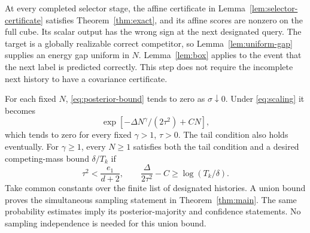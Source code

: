 At every completed selector stage, the affine certificate in
Lemma~\ref{lem:selector-certificate} satisfies
Theorem~\ref{thm:exact}, and its affine scores are nonzero on the full
cube. Its scalar output has the wrong sign at the next designated
query. The target is a globally realizable correct competitor, so
Lemma~\ref{lem:uniform-gap} supplies an energy gap uniform in $N$.
Lemma~\ref{lem:box} applies to the event that the next label is predicted
correctly. This step does not require the incomplete next history to
have a covariance certificate.

For each fixed $N$, \eqref{eq:posterior-bound} tends to zero as
$\sigma\downarrow0$. Under \eqref{eq:scaling} it becomes
\[
 \exp[-\Delta N^\gamma/(2\tau^2)+CN],
\]
which tends to zero for every fixed $\gamma>1$, $\tau>0$.
The tail condition also holds eventually. For $\gamma\ge1$, every
$N\ge1$ satisfies both the tail condition and a desired competing-mass
bound $\delta/T_k$ if
\[
 \tau^2<\frac{e_1}{d+2},\qquad
 \frac{\Delta}{2\tau^2}-C\ge\log(T_k/\delta).
\]
Take common constants over the finite list of designated histories.
A union bound proves the simultaneous sampling statement in
Theorem~\ref{thm:main}. The same probability estimates imply its
posterior-majority and confidence statements. No sampling independence
is needed for this union bound.
